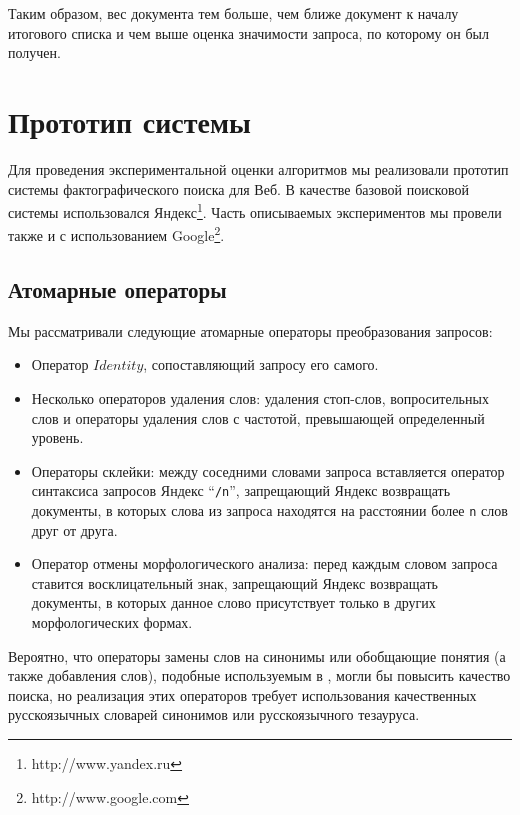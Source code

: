 \documentclass{article}
\begin{document}
Таким образом, вес документа тем больше, чем ближе документ к началу итогового списка
и чем выше оценка значимости запроса, по которому он был получен.





\section{Прототип системы}

Для проведения экспериментальной оценки алгоритмов мы реализовали прототип
системы фактографического поиска для Веб.
В качестве базовой поисковой системы использовался
Яндекс\footnote{http://www.yandex.ru}.
Часть описываемых экспериментов мы провели также и
с использованием Google\footnote{http://www.google.com}.

\subsection{Атомарные операторы}

Мы рассматривали следующие атомарные операторы
преобразования запросов:

\begin{itemize}
\item Оператор $Identity$, сопоставляющий запросу его самого.
\item Несколько операторов удаления слов: удаления стоп-слов, вопросительных слов
и операторы удаления слов с частотой, превышающей определенный уровень.
\item Операторы склейки: между соседними словами запроса вставляется оператор синтаксиса
запросов Яндекс ``{\tt /n}'',
запрещающий Яндекс возвращать документы, в которых слова из запроса находятся на
расстоянии более {\tt n} слов друг от друга.
\item Оператор отмены морфологического анализа: перед каждым словом запроса
ставится восклицательный знак, запрещающий Яндекс возвращать документы, в которых
данное слово присутствует только в других морфологических формах.
\end{itemize}

Вероятно, что операторы замены слов на синонимы или обобщающие понятия (а
также добавления слов), подобные используемым в \cite{qa:radev:qasm}, могли
бы повысить качество поиска, но реализация этих операторов требует
использования качественных русскоязычных словарей синонимов или русскоязычного тезауруса.
\end{document}
